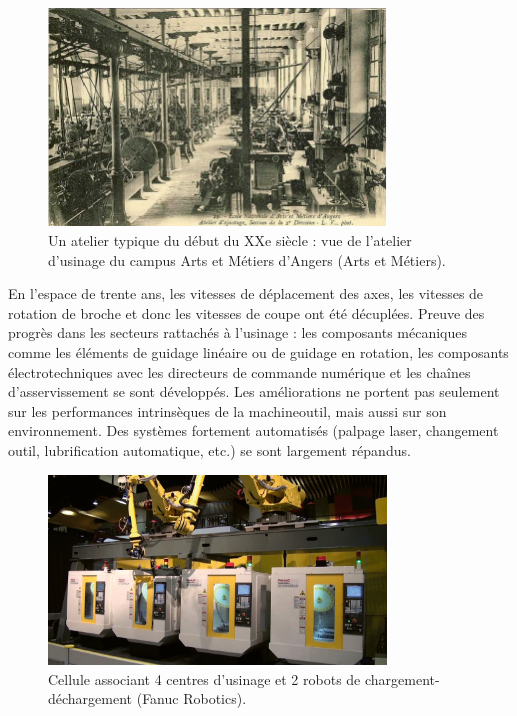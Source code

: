 \documentclass[
	11pt, %
	fleqn, %
	a4paper, %
]{LegrandOrangeBook}
\begin{document}
\begin{figure}[H] %
	\centering %

	\includegraphics[width=0.8\textwidth]{Images/A02.PNG} %
	\caption{Un atelier typique du début du XXe siècle : vue de l’atelier d’usinage
du campus Arts et Métiers d’Angers (Arts et Métiers).}
	\label{fig:placeholder} %

\end{figure}

En l’espace de trente ans, les vitesses de déplacement des
axes, les vitesses de rotation de broche et donc les vitesses de coupe ont été décuplées. Preuve
des progrès dans les secteurs rattachés à l’usinage : les composants mécaniques comme les
éléments de guidage linéaire ou de guidage en rotation, les composants électrotechniques avec
les directeurs de commande numérique et les chaînes d’asservissement se sont développés. Les
améliorations ne portent pas seulement sur les performances intrinsèques de la machineoutil,
mais aussi sur son environnement. Des systèmes fortement automatisés (palpage laser,
changement outil, lubrification automatique, etc.) se sont largement répandus.


\begin{figure}[H] %
	\centering %

	\includegraphics[width=0.8\textwidth]{Images/A03.PNG} %
	\caption{Cellule associant 4 centres d’usinage et 2 robots de chargement-déchargement (Fanuc Robotics).}
	\label{fig:placeholder} %

\end{figure}
\end{document}
